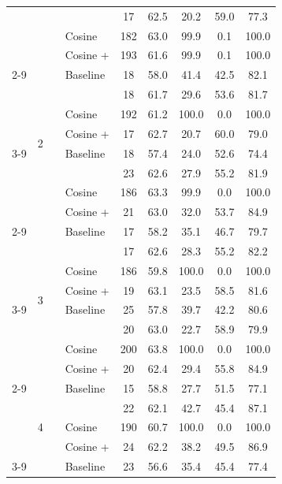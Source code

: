 \begin{longtable}{lll l c c c c c}
 &  &  & \method{} & 17 & 62.5 & 20.2 & 59.0 & 77.3 \\
 &  &  & Cosine & 182 & 63.0 & 99.9 & 0.1 & 100.0 \\
 &  &  & Cosine + \method{} & 193 & 61.6 & 99.9 & 0.1 & 100.0 \\
\cmidrule(lr){2-9}
 & \multirow{8}{*}{2} & \multirow{4}{*}{\adamw{}} & Baseline & 18 & 58.0 & 41.4 & 42.5 & 82.1 \\
 &  &  & \method{} & 18 & 61.7 & 29.6 & 53.6 & 81.7 \\
 &  &  & Cosine & 192 & 61.2 & 100.0 & 0.0 & 100.0 \\
 &  &  & Cosine + \method{} & 17 & 62.7 & 20.7 & 60.0 & 79.0 \\
\cmidrule(lr){3-9}
 &  & \multirow{4}{*}{\sgdm{}} & Baseline & 18 & 57.4 & 24.0 & 52.6 & 74.4 \\
 &  &  & \method{} & 23 & 62.6 & 27.9 & 55.2 & 81.9 \\
 &  &  & Cosine & 186 & 63.3 & 99.9 & 0.0 & 100.0 \\
 &  &  & Cosine + \method{} & 21 & 63.0 & 32.0 & 53.7 & 84.9 \\
\cmidrule(lr){2-9}
 & \multirow{8}{*}{3} & \multirow{4}{*}{\adamw{}} & Baseline & 17 & 58.2 & 35.1 & 46.7 & 79.7 \\
 &  &  & \method{} & 17 & 62.6 & 28.3 & 55.2 & 82.2 \\
 &  &  & Cosine & 186 & 59.8 & 100.0 & 0.0 & 100.0 \\
 &  &  & Cosine + \method{} & 19 & 63.1 & 23.5 & 58.5 & 81.6 \\
\cmidrule(lr){3-9}
 &  & \multirow{4}{*}{\sgdm{}} & Baseline & 25 & 57.8 & 39.7 & 42.2 & 80.6 \\
 &  &  & \method{} & 20 & 63.0 & 22.7 & 58.9 & 79.9 \\
 &  &  & Cosine & 200 & 63.8 & 100.0 & 0.0 & 100.0 \\
 &  &  & Cosine + \method{} & 20 & 62.4 & 29.4 & 55.8 & 84.9 \\
\cmidrule(lr){2-9}
 & \multirow{8}{*}{4} & \multirow{4}{*}{\adamw{}} & Baseline & 15 & 58.8 & 27.7 & 51.5 & 77.1 \\
 &  &  & \method{} & 22 & 62.1 & 42.7 & 45.4 & 87.1 \\
 &  &  & Cosine & 190 & 60.7 & 100.0 & 0.0 & 100.0 \\
 &  &  & Cosine + \method{} & 24 & 62.2 & 38.2 & 49.5 & 86.9 \\
\cmidrule(lr){3-9}
 &  & \multirow{4}{*}{\sgdm{}} & Baseline & 23 & 56.6 & 35.4 & 45.4 & 77.4 \\

\end{longtable}
